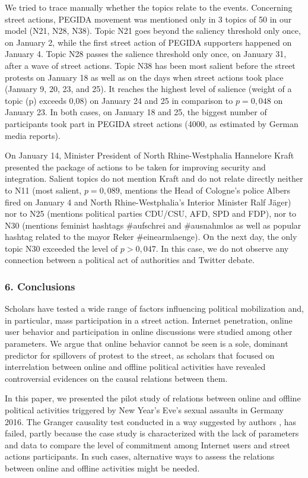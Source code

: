 We tried to trace manually whether the topics relate to the events. Concerning street actions, PEGIDA movement was mentioned only in 3 topics of 50 in our model (N21, N28, N38). Topic N21 goes beyond the saliency threshold only once, on January 2, while the first street action of PEGIDA supporters happened on January 4. Topic N28 passes the salience threshold only once, on January 31, after a wave of street actions. Topic N38 has been most salient before the street protests on January 18 as well as on the days when street actions took place (January 9, 20, 23, and 25). It reaches the highest level of salience (weight of a topic (p) exceeds 0,08) on January 24 and 25 in comparison to \(p = 0,048\) on January 23. In both cases, on January 18 and 25, the biggest number of participants took part in PEGIDA street actions (4000, as estimated by German media reports).

On January 14, Minister President of North Rhine-Westphalia Hannelore Kraft presented the package of actions to be taken for improving security and integration. Salient topics do not mention Kraft and do not relate directly neither to N11 (most salient, \(p = 0,089\), mentions the Head of Cologne’s police Albers fired on January 4 and North Rhine-Westphalia’s Interior Minister Ralf Jäger) nor to N25 (mentions political parties CDU/CSU, AFD, SPD and FDP), nor to N30 (mentions feminist hashtags \#aufschrei and \#ausnahmlos as well as popular hashtag related to the mayor Reker \#einearmlaenge). On the next day, the only topic N30 exceeded the level of \(p > 0,047\). In this case, we do not observe any connection between a political act of authorities and Twitter debate.

\subsubsection{6. Conclusions}

Scholars have tested a wide range of factors influencing political mobilization and, in particular, mass participation in a street action. Internet penetration, online user behavior and participation in online discussions were studied among other parameters. We argue that online behavior cannot be seen is a sole, dominant predictor for spillovers of protest to the street, as scholars that focused on interrelation between online and offline political activities have revealed controversial evidences on the causal relations between them.

In this paper, we presented the pilot study of relations between online and offline political activities triggered by New Year’s Eve’s sexual assaults in Germany 2016. The Granger causality test conducted in a way suggested by authors \cite{BastosMerceaCharperntier}, has failed, partly because the case study is characterized with the lack of parameters and data to compare the level of commitment among Internet users and street actions participants. In such cases, alternative ways to assess the relations between online and offline activities might be needed.

